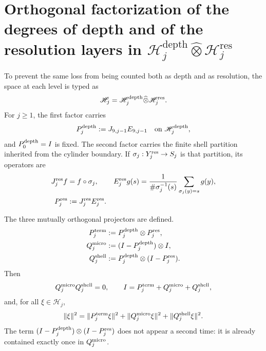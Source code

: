 \section{Orthogonal factorization of the degrees of depth and of the resolution layers in \(\mathscr H_j^{\mathrm{depth}}\widehat\otimes\mathscr H_j^{\mathrm{res}}\)}
\label{sec:pdfv2-sol-micro-shell}

To prevent the same loss from being counted both as depth and as
resolution, the space at each level is typed as
\begin{equation}\label{eq:pdfv2-sol-factor-hilbert}
 \mathscr H_j
 =\mathscr H_j^{\rm depth}\widehat\otimes
  \mathscr H_j^{\rm res}.
\end{equation}
For \(j\geq1\), the first factor carries
\[
 P_j^{\rm depth}:=J_{9,j-1}E_{9,j-1}
 \quad\text{on }\mathscr H_j^{\rm depth},
\]
and \(P_0^{\rm depth}=I\) is fixed. The second factor carries the finite
shell partition inherited from the cylinder boundary. If
\(\sigma_j:Y_j^{\rm res}\to S_j\) is that partition, its operators are
\begin{align}
 J_j^{\rm res}f&=f\circ\sigma_j,
 &E_j^{\rm res}g(s)&=
 \frac1{\#\sigma_j^{-1}(s)}
 \sum_{\sigma_j(y)=s}g(y),
 \label{eq:pdfv2-sol-shell-je}\\
 P_j^{\rm res}&:=J_j^{\rm res}E_j^{\rm res}.
 \label{eq:pdfv2-sol-shell-p}
\end{align}

The three mutually orthogonal projectors are defined.
\begin{align}
 P_j^{\rm term}
 &:=P_j^{\rm depth}\otimes P_j^{\rm res},
 \label{eq:pdfv2-sol-pterm}\\
 Q_j^{\rm micro}
 &:=(I-P_j^{\rm depth})\otimes I,
 \label{eq:pdfv2-sol-qmicro}\\
 Q_j^{\rm shell}
 &:=P_j^{\rm depth}\otimes(I-P_j^{\rm res}).
 \label{eq:pdfv2-sol-qshell}
\end{align}
Then
\begin{equation}\label{eq:pdfv2-sol-ortogonalidad}
 Q_j^{\rm micro}Q_j^{\rm shell}=0,
 \qquad
 I=P_j^{\rm term}+Q_j^{\rm micro}+Q_j^{\rm shell},
\end{equation}
and, for all \(\xi\in\mathscr H_j\),
\begin{equation}\label{eq:pdfv2-sol-pitagoras}
 \|\xi\|^2
 =\|P_j^{\rm term}\xi\|^2
  +\|Q_j^{\rm micro}\xi\|^2
  +\|Q_j^{\rm shell}\xi\|^2.
\end{equation}
The term
\((I-P_j^{\rm depth})\otimes(I-P_j^{\rm res})\) does not appear a second time: it is already
contained exactly once in \(Q_j^{\rm micro}\).

